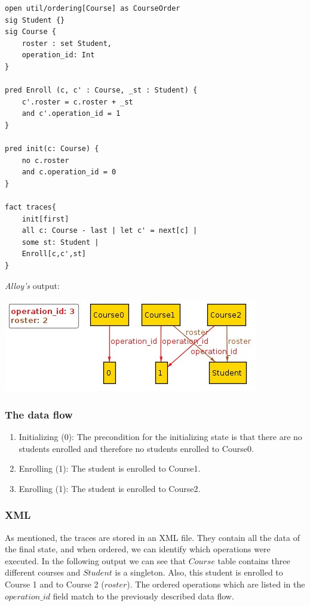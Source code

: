 \documentclass[oneside]{book}
\begin{document}
\begin{lstlisting}
open util/ordering[Course] as CourseOrder
sig Student {}
sig Course {
	roster : set Student,
	operation_id: Int
}

pred Enroll (c, c' : Course, _st : Student) {
	c'.roster = c.roster + _st
	and c'.operation_id = 1 
}

pred init(c: Course) {
	no c.roster
	and c.operation_id = 0
}

fact traces{
    init[first]
    all c: Course - last | let c' = next[c] | 
	some st: Student |
	Enroll[c,c',st]
}
\end{lstlisting}
\newpage
\textit{Alloy's} output:\\
\begin{center}
\includegraphics[scale=0.7]{output_traces}
\end{center}

\subsubsection{The data flow}
\begin{enumerate}
	\item Initializing (0): The precondition for the initializing state is that there are no students enrolled and therefore no students enrolled to Course0.
	\item Enrolling (1): The student is enrolled to Course1.
	\item Enrolling (1): The student is enrolled to Course2.
\end{enumerate}

\subsubsection{XML}

As mentioned, the traces are stored in an XML file. They contain all the data of the final state, and when ordered, we can identify which operations were executed. In the following output we can see that $Course$ table contains three different courses and $Student$ is a singleton. Also, this student is enrolled to Course 1 and to Course 2 ($roster$). The ordered operations which are listed in the $operation\_id$ field match to the previously described data flow.
\end{document}
